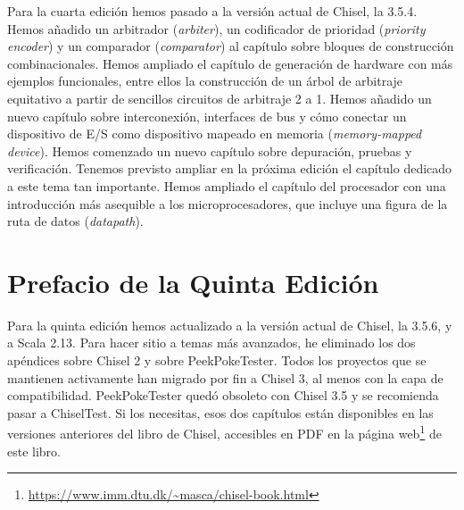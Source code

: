 \documentclass[%
    10pt,
    headinclude, footinclude=false,
    openright, %
    notitlepage,
    cleardoublepage=empty,
    headsepline,
    numbers=noenddot,
    bibliography=totoc, index=totoc,
    ]{scrbook}
\newcommand{\myref}[2]{\href{#1}{#2}}
\renewcommand{\myref}[2]{{#2}{\footnote{\url{#1}}}}
\begin{document}
Para la cuarta edición hemos pasado a la versión actual de Chisel, la 3.5.4. Hemos añadido un arbitrador (\textit{arbiter}), 
un codificador de prioridad (\textit{priority encoder}) y un comparador (\textit{comparator}) al capítulo sobre 
bloques de construcción combinacionales. Hemos ampliado el capítulo de generación de hardware con más ejemplos 
funcionales, entre ellos la construcción de un árbol de arbitraje equitativo a partir de sencillos circuitos 
de arbitraje 2 a 1. Hemos añadido un nuevo capítulo sobre interconexión, interfaces de bus y cómo conectar 
un dispositivo de E/S como dispositivo mapeado en memoria (\textit{memory-mapped device}). Hemos comenzado un nuevo 
capítulo sobre depuración, pruebas y verificación. Tenemos previsto ampliar en la próxima edición el capítulo dedicado 
a este tema tan importante. Hemos ampliado el capítulo del procesador con una introducción más asequible a los 
microprocesadores, que incluye una figura de la ruta de datos (\textit{datapath}).

\section*{Prefacio de la Quinta Edición}


Para la quinta edición hemos actualizado a la versión actual de Chisel, la 3.5.6, y a Scala 2.13. 
Para hacer sitio a temas más avanzados, he eliminado los dos apéndices sobre Chisel 2 y sobre PeekPokeTester. 
Todos los proyectos que se mantienen activamente han migrado por fin a Chisel 3, al menos con la capa de 
compatibilidad. PeekPokeTester quedó obsoleto con Chisel 3.5 y se recomienda pasar a ChiselTest. Si los necesitas, 
esos dos capítulos están disponibles en las versiones anteriores del libro de Chisel, accesibles en PDF en la 
\myref{https://www.imm.dtu.dk/~masca/chisel-book.html}{página web} de este libro.
\end{document}
